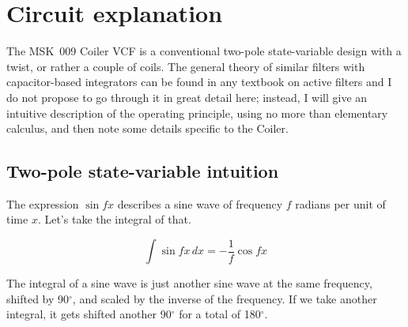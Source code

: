 
%
%
%
%
%
%

\chapter{Circuit explanation}

The MSK~009 Coiler VCF is a conventional two-pole state-variable design with
a twist, or rather a couple of coils.  The general theory of similar filters
with capacitor-based integrators can be found in any textbook on active
filters and I do not propose to go through it in great detail here; instead,
I will give an intuitive description of the operating principle, using no
more than elementary calculus, and then note some details specific to the
Coiler.


\section{Two-pole state-variable intuition}

The expression $\sin f\!x$ describes a sine wave of frequency $f$ radians per
unit of time $x$.  Let's take the integral of that.

\begin{equation*}
  \int \sin f\!x \, dx = - \frac{1}{f} \cos f\!x
\end{equation*}

The integral of a sine wave is just another sine wave at the same frequency,
shifted by 90$^\circ$, and scaled by the inverse of the frequency.  If we
take another integral, it gets shifted another 90$^\circ$ for a total of
180$^\circ$.


